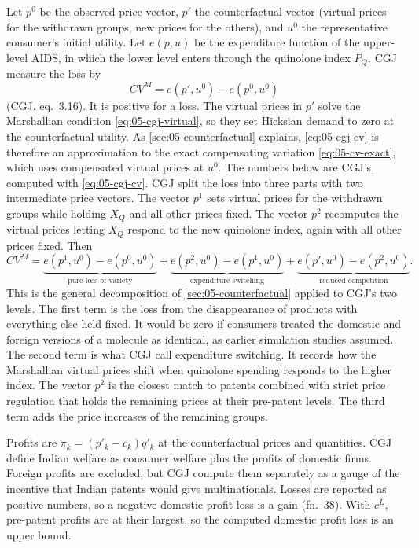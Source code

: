  Let $p^0$ be the observed price vector, $p'$ the counterfactual vector (virtual prices for the
withdrawn groups, new prices for the others), and $u^0$ the representative consumer's initial utility. Let $e(p, u)$
be the expenditure function of the upper-level AIDS, in which the lower level enters through the quinolone index
$P_Q$. CGJ measure the loss by
\begin{equation}\label{eq:05-cgj-cv}
CV^M = e(p', u^0) - e(p^0, u^0)
\end{equation}
(CGJ, eq.~3.16). It is positive for a loss. The virtual prices in $p'$ solve the Marshallian condition
\eqref{eq:05-cgj-virtual}, so they set Hicksian demand to zero at the counterfactual utility. As
\cref{sec:05-counterfactual} explains, \eqref{eq:05-cgj-cv} is therefore an approximation to the exact compensating
variation \eqref{eq:05-cv-exact}, which uses compensated virtual prices at $u^0$. The numbers below are CGJ's, computed
with \eqref{eq:05-cgj-cv}. CGJ split the loss into three parts with two intermediate price vectors. The
vector $p^1$ sets virtual prices for the withdrawn groups while holding $X_Q$ and all other prices fixed. The vector
$p^2$ recomputes the virtual prices letting $X_Q$ respond to the new quinolone index, again with all other prices
fixed. Then
\begin{equation}\label{eq:05-cgj-decomp}
CV^M = \underbrace{e(p^1, u^0) - e(p^0, u^0)}_{\text{pure loss of variety}}
+ \underbrace{e(p^2, u^0) - e(p^1, u^0)}_{\text{expenditure switching}}
+ \underbrace{e(p', u^0) - e(p^2, u^0)}_{\text{reduced competition}} .
\end{equation}
This is the general decomposition of \cref{sec:05-counterfactual} applied to CGJ's two levels. The first term is the
loss from the disappearance of products with everything else held fixed. It would be zero if consumers treated the
domestic and foreign versions of a molecule as identical, as earlier simulation studies assumed. The second term is
what CGJ call expenditure switching. It records how the Marshallian virtual prices shift when quinolone spending
responds to the higher index. The vector $p^2$ is the closest match to patents combined
with strict price regulation that holds the remaining prices at their pre-patent levels. The third term adds the price
increases of the remaining groups.

 Profits are $\pi_k = (p'_k - c_k)q'_k$ at the counterfactual prices and
quantities. CGJ define Indian welfare as consumer welfare plus the profits of domestic firms. Foreign profits are
excluded, but CGJ compute them separately as a gauge of the incentive that Indian patents would give multinationals.
Losses are reported as positive numbers, so a negative domestic profit loss is a gain (fn.~38). With $c^L$, pre-patent
profits are at their largest, so the computed domestic profit loss is an upper bound.


